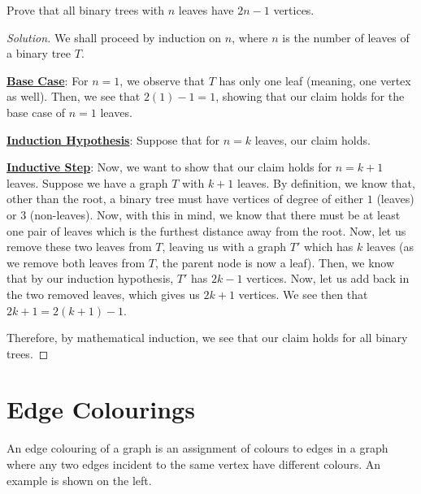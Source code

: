 \documentclass{article}
\newenvironment{solution}{\begin{proof}[Solution]}{\end{proof}}
\begin{document}
\begin{hw}
	Prove that all binary trees with $n$ leaves have $2n-1$ vertices.
\end{hw}
\begin{solution}
	We shall proceed by induction on $n$, where $n$ is the number of leaves of a binary tree $T$.
	
	\textbf{\underline{Base Case}}: For $n=1$, we observe that $T$ has only one leaf (meaning, one vertex as well). Then, we see that $2(1)-1 = 1$, showing that our claim holds for the base case of $n=1$ leaves.
	
	\textbf{\underline{Induction Hypothesis}}: Suppose that for $n=k$ leaves, our claim holds.
	
	\textbf{\underline{Inductive Step}}: Now, we want to show that our claim holds for $n=k+1$ leaves. Suppose we have a graph $T$ with $k+1$ leaves. By definition, we know that, other than the root, a binary tree must have vertices of degree of either $1$ (leaves) or $3$ (non-leaves). Now, with this in mind, we know that there must be at least one pair of leaves which is the furthest distance away from the root. Now, let us remove these two leaves from $T$, leaving us with a graph $T'$ which has $k$ leaves (as we remove both leaves from $T$, the parent node is now a leaf). Then, we know that by our induction hypothesis, $T'$ has $2k-1$ vertices. Now, let us add back in the two removed leaves, which gives us $2k+1$ vertices. We see then that $2k+1 = 2(k+1)-1$.
	
	Therefore, by mathematical induction, we see that our claim holds for all binary trees.
\end{solution}

\newpage

\section{Edge Colourings}
An edge colouring of a graph is an assignment of colours to edges in a graph where any two edges incident to the same vertex have different colours. An example is shown on the left.

\begin{center}
\end{center}
\end{document}
